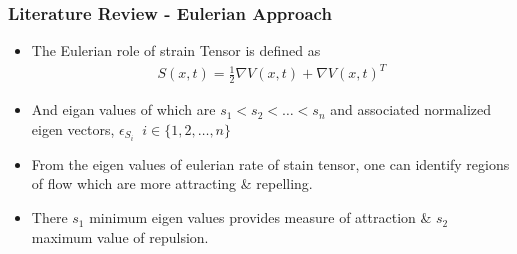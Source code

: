 \documentclass[../presentation.tex]{subfiles}
\begin{document}
\begin{frame}
  \frametitle{Literature Review - Eulerian Approach}

  \begin{itemize}
    \item The Eulerian role of strain Tensor is defined as
    \begin{equation}
      \begin{aligned}
        S(x, t) = \frac{1}{2}{\nabla V(x, t) + \nabla V(x, t)^T}
      \end{aligned}
    \end{equation}
    
    \item And eigan values of which are \(s_1 < s_2 < \dots < s_n\) and associated normalized eigen vectors, \(\epsilon_{S_i}\;\; i \in \{1, 2, \dots, n\}\)
    
    \item From the eigen values of eulerian rate of stain tensor, one can identify regions of flow which are more attracting \& repelling.
    
    \item There \(s_1\) \rightarrow minimum eigen values provides measure of attraction \& \(s_2\) maximum value of repulsion.
  \end{itemize}
\end{frame}
\end{document}
